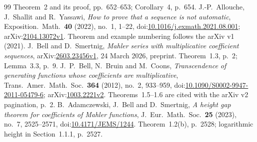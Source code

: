 \documentclass[11pt]{article}
\begin{document}
\begin{thebibliography}{99}
Theorem~2 and its proof, pp.~652--653; Corollary~4, p.~654.
 J.-P.~Allouche, J.~Shallit and R.~Yassawi,
\emph{How to prove that a sequence is not automatic},
Exposition.\ Math.\ \textbf{40} (2022), no.~1, 1--22,
doi:\href{https://doi.org/10.1016/j.exmath.2021.08.001}{10.1016/j.exmath.2021.08.001};
arXiv:\href{https://arxiv.org/abs/2104.13072v1}{2104.13072v1}.
Theorem and example numbering follows the arXiv v1 (2021).
 J.~Bell and D.~Smertnig,
\emph{Mahler series with multiplicative coefficient sequences},
arXiv:\href{https://arxiv.org/abs/2603.23456v1}{2603.23456v1},
24 March 2026, preprint. Theorem~1.3, p.~2; Lemma~3.3, p.~9.
 J.~P.~Bell, N.~Bruin and M.~Coons,
\emph{Transcendence of generating functions whose coefficients are multiplicative},
Trans.\ Amer.\ Math.\ Soc.\ \textbf{364} (2012), no.~2, 933--959,
doi:\href{https://doi.org/10.1090/S0002-9947-2011-05479-6}{10.1090/S0002-9947-2011-05479-6};
arXiv:\href{https://arxiv.org/abs/1003.2221v2}{1003.2221v2}.
Theorems~1.5--1.6 are cited with the arXiv v2 pagination, p.~2.
B.~Adamczewski, J.~Bell and D.~Smertnig,
\emph{A height gap theorem for coefficients of Mahler functions},
J.~Eur.~Math.~Soc.\ \textbf{25} (2023), no.~7, 2525--2571,
doi:\href{https://doi.org/10.4171/JEMS/1244}{10.4171/JEMS/1244}.
Theorem~1.2(b), p.~2528; logarithmic height in Section~1.1.1, p.~2527.
\end{thebibliography}

\companionpapercontext
\end{document}
